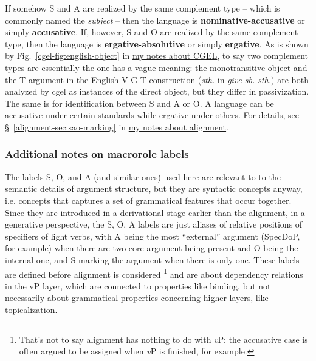\documentclass[UTF8, a4paper, oneside, scheme=plain]{ctexart}
\newcommand*{\citesec}[1]{\S~{#1}}
\newcommand*{\citefig}[1]{Fig.~{#1}}
\newcommand*{\concept}[1]{\textbf{#1}}
\newcommand*{\term}[1]{\emph{#1}}
\newcommand*{\corpus}[1]{\emph{#1}}
\newcommand*{\vP}{\textit{v}P}
\newcommand{\cgel}{\href{../English/cambridge.pdf}{my notes about CGEL}}
\newcommand{\alignment}{\href{../alignment/alignment.pdf}{my notes about alignment}}
\begin{document}
If somehow S and A are realized by the same complement type 
-- which is commonly named the \term{subject} --
then the language is \concept{nominative-accusative} or simply \concept{accusative}.
If, however, S and O are realized by the same complement type,
then the language is \concept{ergative-absolutive} or simply \concept{ergative}.
As is shown by \citefig{\ref{cgel-fig:english-object}} in \cgel,
to say two complement types are essentially the one 
has a vague meaning:
the monotransitive object and the T argument in the English V-G-T construction 
(\term{sth.} in \corpus{give sb. sth.})
are both analyzed by \ac{cgel} as instances of the direct object,
but they differ in passivization.
The same is for identification between S and A or O.
A language can be accusative under certain standards while ergative under others.
For details, see \citesec{\ref{alignment-sec:sao-marking}} in \alignment.

\subsubsection{Additional notes on macrorole labels}

The labels S, O, and A (and similar ones) 
used here are relevant to to the semantic details of argument structure,
but they are syntactic concepts anyway,
i.e. concepts that captures a set of grammatical features that occur together.
Since they are introduced in a derivational stage earlier than the alignment,
in a generative perspective,
the S, O, A labels are just aliases of relative positions of specifiers of light verbs, 
with A being the most ``external'' argument (SpecDoP, for example) 
when there are two core argument being present and O being the internal one, 
and S marking the argument when there is only one. 
These labels are defined before alignment is considered%
\footnote{
    That's not to say alignment has nothing to do with \vP:
    the accusative case is often argued to be assigned when \vP{} is finished, for example. 
}
and are about dependency relations in the vP layer, 
which are connected to properties like binding,
but not necessarily about grammatical properties concerning higher layers, 
like topicalization.
\end{document}
